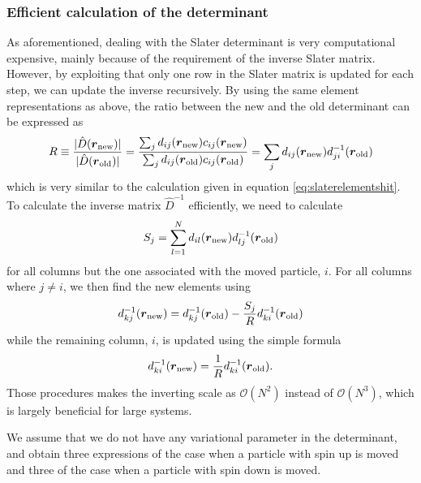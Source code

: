 \subsubsection{Efficient calculation of the determinant} \label{sec:efficientcalculationsofslaterdeterminant}
As aforementioned, dealing with the Slater determinant is very computational expensive, mainly because of the requirement of the inverse Slater matrix. However, by exploiting that only one row in the Slater matrix is updated for each step, we can update the inverse recursively. By using the same element representations as above, the ratio between the new and the old determinant can be expressed as
\begin{equation}
R\equiv \frac{|\hat{D}(\boldsymbol{{r}}_{\text{new}})|}{|\hat{D}(\boldsymbol{{r}}_{\text{old}})|}=\frac{\sum_{j}d_{ij}(\boldsymbol{{r}}_{\text{new}})c_{ij}(\boldsymbol{{r}}_{\text{new}})}{\sum_{j}d_{ij}(\boldsymbol{{r}}_{\text{old}})c_{ij}(\boldsymbol{{r}}_{\text{old}})}=\sum_{j}d_{ij}(\boldsymbol{{r}}_{\text{new}})d_{ji}^{-1}(\boldsymbol{{r}}_{\text{old}})
\label{eq:slaterratio}
\end{equation}
which is very similar to the calculation given in equation \eqref{eq:slaterelementshit}. To calculate the inverse matrix $\hat{D}^{-1}$ efficiently, we need to calculate
\begin{equation}
S_j=\sum_{l=1}^Nd_{il}(\boldsymbol{{r}}_{\text{new}})d_{lj}^{-1}(\boldsymbol{{r}}_{\text{old}})
\label{eq:slaters}
\end{equation}
for all columns but the one associated with the moved particle, $i$. For all columns where $j\neq i$, we then find the new elements using
\begin{equation}
d_{kj}^{-1}(\boldsymbol{{r}}_{\text{new}})=d_{kj}^{-1}(\boldsymbol{{r}}_{\text{old}})-\frac{S_j}{R}d_{ki}^{-1}(\boldsymbol{{r}}_{\text{old}})
\label{eq:slaterinverse}
\end{equation}
while the remaining column, $i$, is updated using the simple formula \cite{morten_hjorth-jensen_computational_2019}
\begin{equation}
d_{ki}^{-1}(\boldsymbol{{r}}_{\text{new}})=\frac{1}{R}d_{ki}^{-1}(\boldsymbol{{r}}_{\text{old}}).
\label{eq:slaterinverse2}
\end{equation}
Those procedures makes the inverting scale as $\mathcal{O}(N^2)$ instead of $\mathcal{O}(N^3)$, which is largely beneficial for large systems.

We assume that we do not have any variational parameter in the determinant, and obtain three expressions of the case when a particle with spin up is moved and three of the case when a particle with spin down is moved. 

